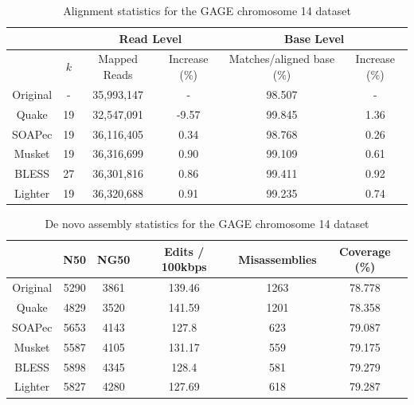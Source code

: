 \documentclass{bmcart}
\begin{document}
\begin{backmatter}
\begin{table}[h!]%
\caption{Alignment statistics for the GAGE chromosome 14 dataset}
\begin{tabular}{|c|c|c|c||c|c|}\hline
  &  & \multicolumn{2}{|c||}{Read Level} & \multicolumn{2}{|c|}{Base Level} \\ \hline
  & $k$ & Mapped Reads  &Increase (\%) & Matches/aligned base (\%)  & Increase (\%) \\ \hline
Original & - & 35,993,147	&- 		&	 98.507 & -\\ \hline
Quake 	& 19 & 32,547,091	& -9.57 &	99.845 & 1.36 \\ \hline
SOAPec  & 19 & 36,116,405  & 0.34 & 98.768 & 0.26 \\ \hline
Musket 	& 19 &	36,316,699	& 0.90	& 99.109 & 0.61 \\ \hline
BLESS 	& 27 &36,301,816	& 0.86	& 99.411 & 0.92 \\ \hline
Lighter	& 19 & 36,320,688 & 0.91	& 99.235 & 0.74 \\ \hline
\end{tabular}
\end{table}

\begin{table}[h!] %
\caption{De novo assembly statistics for the GAGE chromosome 14 dataset}
\begin{tabular}{|c|c|c|c|c|c|} \hline
	   & N50 &	NG50	& Edits / 100kbps &	Misassemblies	& Coverage (\%) \\ \hline
Original &	5290 & 3861	& 139.46 &1263	& 78.778 \\ \hline
Quake	&	4829 & 3520 & 141.59 & 1201 &	78.358 \\ \hline
SOAPec & 5653	& 4143	& 127.8 &	623	 & 79.087 \\ \hline
Musket	&	5587& 	4105 &	131.17	& 559 &	79.175  \\ \hline
BLESS	&	5898 &	4345 &	128.4	& 581 &	79.279 \\ \hline
Lighter	&	5827 & 4280	& 127.69	& 618 & 79.287 \\ \hline
\end{tabular}
\end{table}


\end{backmatter}
\end{document}
